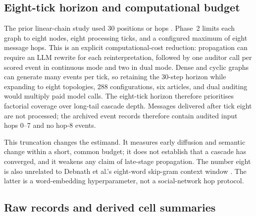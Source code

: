 \subsection{Eight-tick horizon and computational budget}
\label{subsec:eight-hop-budget}

The prior linear-chain study used 30 positions or hops
\parencite{maurya2025simulating}. Phase~2 limits each graph to eight nodes,
eight processing ticks, and a configured maximum of eight message hops. This is an explicit
computational-cost reduction: propagation can require an LLM rewrite for each
reinterpretation, followed by one auditor call per scored event in continuous
mode and two in dual mode.  Dense and cyclic graphs can generate many events
per tick, so retaining the 30-step horizon while expanding to eight
topologies, 288 configurations, six articles, and dual auditing would multiply
paid model calls. The eight-tick horizon therefore prioritises factorial
coverage over long-tail cascade depth. Messages delivered after tick eight
are not processed; the archived event records therefore contain audited input
hops 0--7 and no hop-8 events.

This truncation changes the estimand.  It measures early diffusion and
semantic change within a short, common budget; it does not establish that a
cascade has converged, and it weakens any claim of late-stage
propagation.  The number eight is also unrelated to Debnath et al.'s
eight-word skip-gram context window \parencite{debnath2023conspiracy}.  The
latter is a word-embedding hyperparameter, not a social-network hop protocol.

\subsection{Raw records and derived cell summaries}
\label{subsec:simulation-schema}

